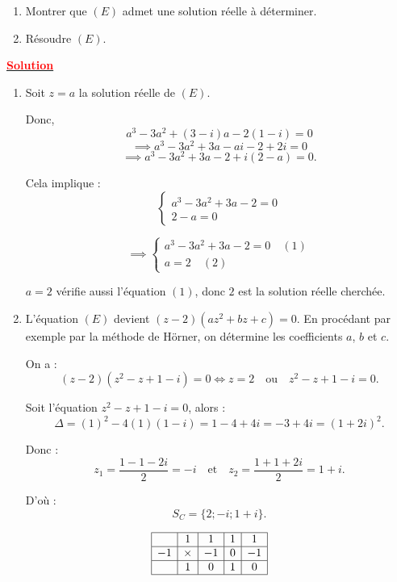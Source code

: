 \documentclass[12pt,a4paper]{article}
\newcounter{exemple} %
\begin{document}
\begin{enumerate}
    \item Montrer que $(E)$ admet une solution réelle à déterminer.

    \item Résoudre $(E)$.
\end{enumerate}
\underline{\textbf{\textcolor{red}{Solution}}}\\

\begin{enumerate}
    \item Soit $z = a$ la solution réelle de $(E)$.

    Donc,
    \[
    a^3 - 3a^2 + (3 - i)a - 2(1 - i) = 0
    \]
    \[
    \implies a^3 - 3a^2 + 3a - ai - 2 + 2i = 0
    \]
    \[
    \implies a^3 - 3a^2 + 3a - 2 + i(2 - a) = 0.
    \]

    Cela implique :
    \[
    \begin{cases}
    a^3 - 3a^2 + 3a - 2 = 0 \\
    2 - a = 0
    \end{cases}
    \]

    \[
    \implies
    \begin{cases}
    a^3 - 3a^2 + 3a - 2 = 0 \quad (1) \\
    a = 2 \quad (2)
    \end{cases}
    \]

    $a = 2$ vérifie aussi l’équation $(1)$, donc $2$ est la solution réelle cherchée.
\end{enumerate}
\begin{enumerate}
    \setcounter{enumi}{1}
    \item L’équation $(E)$ devient $(z - 2)(az^2 + bz + c) = 0$.  
    En procédant par exemple par la méthode de Hörner, on détermine les coefficients $a$, $b$ et $c$.

    On a : 
    \[
    (z - 2)(z^2 - z + 1 - i) = 0 \iff z = 2 \quad \text{ou} \quad z^2 - z + 1 - i = 0.
    \]

    Soit l’équation $z^2 - z + 1 - i = 0$, alors :
    \[
    \Delta = (1)^2 - 4(1)(1 - i) = 1 - 4 + 4i = -3 + 4i = (1 + 2i)^2.
    \]

    Donc :
    \[
    z_1 = \frac{1 - 1 - 2i}{2} = -i \quad \text{et} \quad z_2 = \frac{1 + 1 + 2i}{2} = 1 + i.
    \]

    D’où :
    \[
    S_C = \{2; -i; 1 + i\}.
    \]
\end{enumerate}

\[
\begin{array}{|c|c|c|c|c|}
\hline
 & 1 & 1 & 1 & 1  \\ 
\hline
-1 & \times & -1 & 0 & -1 \\ 
\hline
 & 1 & 0 & 1 & 0  \\
\hline
\end{array}
\]
\end{document}
